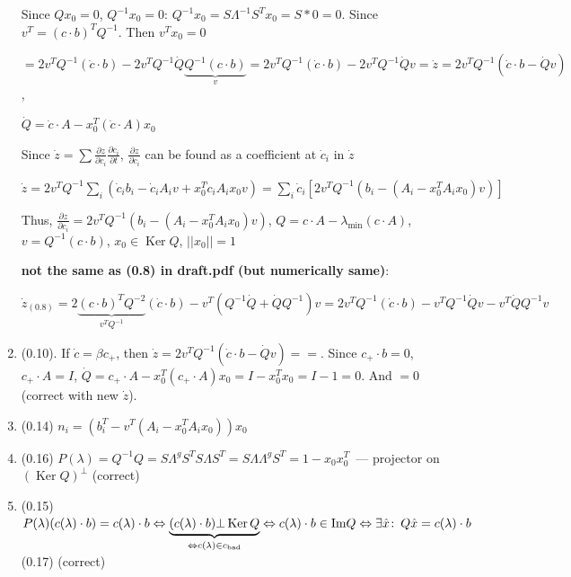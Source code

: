 \documentclass[a4paper]{article}
\DeclareMathOperator{\Ker}{Ker}
\begin{document}
\begin{enumerate}
Since $Qx_0=0$, $Q^{-1}x_0=0$: $Q^{-1}x_0=S\Lambda^{-1}S^Tx_0=S*0=0$. Since $v^T=(c\cdot b)^TQ^{-1}$. Then $v^Tx_0=0$

$\boxed{=}2v^TQ^{-1}(\dot{c}\cdot b)-2v^TQ^{-1}\dot{Q}\underbrace{Q^{-1}(c\cdot b)}_v=2v^TQ^{-1}(\dot{c}\cdot b)-2v^TQ^{-1}\dot{Q}v=\boxed{\dot{z}=2v^TQ^{-1}(\dot{c}\cdot b-\dot{Q}v)}$,

$\dot{Q}=\dot{c}\cdot A-x_0^T(\dot{c}\cdot A)x_0$

Since $\dot{z}=\sum \frac{\partial z}{\partial c_i}\frac{\partial c_i}{\partial t}$, $\frac{\partial z}{\partial c_i}$ can be found as a coefficient at $\dot{c}_i$ in $\dot{z}$

$\dot{z}=2v^TQ^{-1}\sum\limits_i\left(\dot{c}_ib_i-\dot{c}_iA_iv+x_0^T\dot{c}_iA_ix_0v\right)=\sum\limits_i \dot{c}_i\left[2v^TQ^{-1}(b_i-(A_i-x_0^TA_ix_0)v)\right]$

Thus, $\boxed{\frac{\partial z}{\partial c_i}=2v^TQ^{-1}(b_i-(A_i-x_0^TA_ix_0)v)}$, $Q=c\cdot A-\lambda_{\min}(c\cdot A)$, $v=Q^{-1}(c\cdot b)$, $x_0\in\Ker Q$, $||x_0||=1$

{\bf not the same as (0.8) in draft.pdf (but numerically same)}:

$\dot{z}_{(0.8)}=2\underbrace{(c\cdot b)^TQ^{-2}}_{v^TQ^{-1}}(\dot{c}\cdot b)-v^T(Q^{-1}\dot{Q}+\dot{Q}Q^{-1})v=2v^TQ^{-1}(\dot{c}\cdot b)-v^TQ^{-1}\dot{Q}v-v^T\dot{Q}Q^{-1}v$
\item (0.10). If $\dot{c}=\beta c_+$, then $\dot{z}=2v^TQ^{-1}(\dot{c}\cdot b-\dot{Q}v)=\boxed{=}$. Since $c_+\cdot b=0$, $c_+\cdot A=I$, $\dot{Q}=c_+\cdot A-x_0^T(c_+\cdot A)x_0=I-x_0^Tx_0=I-1=0$. And $\boxed{=}0$ (correct with new $\dot{z}$).
\item (0.14) $n_i=\left(b_i^T-v^T(A_i-x_0^TA_ix_0)\right)x_0$
\item (0.16) $P(\lambda)=Q^{-1}Q=S\Lambda^gS^TS\Lambda S^T=S\Lambda\Lambda^g S^T=1-x_0x_0^T$~--- projector on $(\Ker Q)^\bot$ (correct)
\item (0.15) $P(\lambda)(c(\lambda)\cdot b)=c(\lambda)\cdot b\Leftrightarrow \underbrace{(c(\lambda)\cdot b)\bot \Ker Q}_{\Leftrightarrow c(\lambda)\in c_{\mbox{\tiny bad}}}\Leftrightarrow c(\lambda)\cdot b\in\mbox{Im}Q\Leftrightarrow \exists \hat{x}\colon\, Q\hat{x}=c(\lambda)\cdot b$ (0.17) (correct)
\end{enumerate}
\end{document}
